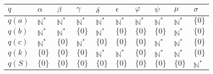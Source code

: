 
\begin{table}[!h]
\begin{tabular}{|l| |l|l|l|l|l|l|l|l|l|}
\hline
$q$    & $\alpha$ & $\beta$ & $\gamma$ & $\delta$ & $\epsilon$ & $\varphi$ & $\psi$ & $\mu$ & $\sigma$ \\ \hline \hline
$q(a)$ & $\mathbb{N}^*$        & $\mathbb{N}^*$       & $\mathbb{N}^*$        & $\mathbb{N}^*$        & $\mathbb{N}^*$          & $\mathbb{N}^*$         & $\mathbb{N}^*$      & $\mathbb{N}^*$     & $\{0\}$        \\ \hline
$q(b)$ & $\mathbb{N}^*$        & $\mathbb{N}^*$       & $\{0\}$        & $\mathbb{N}^*$        & $\{0\}$          & $\{0\}$         & $\{0\}$      & $\mathbb{N}^*$     & $\{0\}$        \\ \hline
$q(c)$ & $\mathbb{N}^*$        & $\{0\}$       & $\mathbb{N}^*$        & $\{0\}$        & $\{0\}$          & $\{0\}$         & $\mathbb{N}^*$      & $\mathbb{N}^*$     & $\{0\}$        \\ \hline
$q(k)$ & $\{0\}$        & $\{0\}$       & $\{0\}$        & $\mathbb{N}^*$        & $\mathbb{N}^*$          & $\{0\}$         & $\mathbb{N}^*$      & $\mathbb{N}^*$     & $\{0\}$        \\ \hline
$q(S)$ & $\{0\}$        & $\{0\}$       & $\{0\}$        & $\{0\}$        & $\{0\}$          & $\{0\}$         & $\{0\}$      & $\{0\}$     & $\mathbb{N}^*$        \\ \hline
\end{tabular}
\end{table}